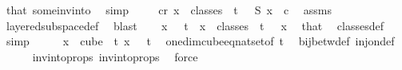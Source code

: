 \begin{isabellebody}
\ that\ some{\isacharunderscore}{\kern0pt}inv{\isacharunderscore}{\kern0pt}into{\isacharunderscore}{\kern0pt}{}\ \isamarkupfalse%
\ simp\isanewline
\isanewline
\ \ \isamarkupfalse%
\ {\isacharasterisk}{\kern0pt}{\isacharcolon}{\kern0pt}\ {\isachardoublequoteopen}{\isasymexists}c{\isacharless}{\kern0pt}r{\isachardot}{\kern0pt}\ {\isasymforall}x\ {\isasymin}\ classes\ {}\ t\ {}{\isachardot}{\kern0pt}\ {\isasymchi}\ {\isacharparenleft}{\kern0pt}S\ x{\isacharparenright}{\kern0pt}\ {\isacharequal}{\kern0pt}\ c{\isachardoublequoteclose}\ \isamarkupfalse%
\ assms{\isacharparenleft}{\kern0pt}{}{\isacharparenright}{\kern0pt}\ \isamarkupfalse%
\ layered{\isacharunderscore}{\kern0pt}subspace{\isacharunderscore}{\kern0pt}def\ \isamarkupfalse%
\ blast\isanewline
\isanewline
\ \ \isamarkupfalse%
\ {\isachardoublequoteopen}x\ {}\ {\isacharequal}{\kern0pt}\ t{\isachardoublequoteclose}\ \ {\isachardoublequoteopen}x\ {\isasymin}\ classes\ {}\ t\ {}{\isachardoublequoteclose}\ \ x\ \isamarkupfalse%
\ that\ \isamarkupfalse%
\ classes{\isacharunderscore}{\kern0pt}def\ \isamarkupfalse%
\ simp\isanewline
\ \ \isamarkupfalse%
\ \isamarkupfalse%
\ {\isachardoublequoteopen}{\isasymexists}{\isacharbang}{\kern0pt}x\ {\isasymin}\ cube\ {}\ {\isacharparenleft}{\kern0pt}t{\isacharplus}{\kern0pt}{}{\isacharparenright}{\kern0pt}{\isachardot}{\kern0pt}\ x\ {}\ {\isacharequal}{\kern0pt}\ t{\isachardoublequoteclose}\ \isamarkupfalse%
\ one{\isacharunderscore}{\kern0pt}dim{\isacharunderscore}{\kern0pt}cube{\isacharunderscore}{\kern0pt}eq{\isacharunderscore}{\kern0pt}nat{\isacharunderscore}{\kern0pt}set{\isacharbrackleft}{\kern0pt}of\ {\isachardoublequoteopen}t{\isacharplus}{\kern0pt}{}{\isachardoublequoteclose}{\isacharbrackright}{\kern0pt}\ \isamarkupfalse%
\ bij{\isacharunderscore}{\kern0pt}betw{\isacharunderscore}{\kern0pt}def\ inj{\isacharunderscore}{\kern0pt}on{\isacharunderscore}{\kern0pt}def\ \isanewline
\ \ \ \ \isamarkupfalse%
\ invintoprops{\isacharparenleft}{\kern0pt}{}{\isacharparenright}{\kern0pt}\ invintoprops{\isacharparenleft}{\kern0pt}{}{\isacharparenright}{\kern0pt}\ \isamarkupfalse%
\ force\ \isanewline
\ \ \isamarkupfalse%

\end{isabellebody}
